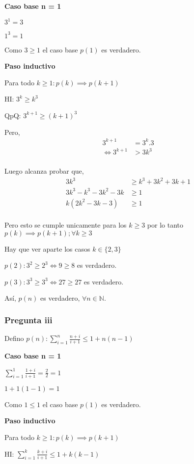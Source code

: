 \textbf{Caso base n = 1}

$ 3^1 = 3 $

$ 1^3 = 1 $

Como $ 3 \geq 1 $ el caso base $p(1)$ es verdadero.

\textbf{Paso inductivo}

Para todo $k \geq 1: p(k) \implies p(k+1)$

HI: $ 3^k \geq k^3$

QpQ: $ 3^{k+1} \geq (k+1)^3$

Pero,
\begin{align*}
    3^{k+1} &= 3^k . 3 \\
    \iff 3^{k+1} &> 3k^3 \\
\end{align*}

Luego alcanza probar que,
\begin{align*}
    3k^3 &\geq k^3 + 3k^2 + 3k + 1 \\
    3k^3 - k^3 - 3k^2 - 3k &\geq 1 \\
    k(2k^2 - 3k -3) &\geq 1 \\
\end{align*}

Pero esto se cumple unicamente para los $k \geq 3$ por lo tanto $p(k) \implies p(k+1); \forall k \geq 3$

Hay que ver aparte los casos $k \in \{ 2,3 \}$

$p(2): 3^2 \geq 2^3 \iff 9 \geq 8$ es verdadero.

$p(3): 3^3 \geq 3^3 \iff 27 \geq 27$ es verdadero.

Así, $p(n)$ es verdadero, $\forall n \in \mathbb{N}$.

\subsubsection{Pregunta iii}

Defino $ p(n): \sum_{i=1}^{n}\frac{n+i}{i+1} \leq 1+n(n-1)$

\textbf{Caso base n = 1}

$ \sum_{i=1}^{1}\frac{1+i}{i+1} = \frac{2}{2} = 1 $

$ 1+1(1-1) = 1 $

Como $ 1 \leq 1 $ el caso base $p(1)$ es verdadero.

\textbf{Paso inductivo}

Para todo $k \geq 1: p(k) \implies p(k+1)$

HI: $\sum_{i=1}^{k}\frac{k+i}{i+1} \leq 1+k(k-1)$

